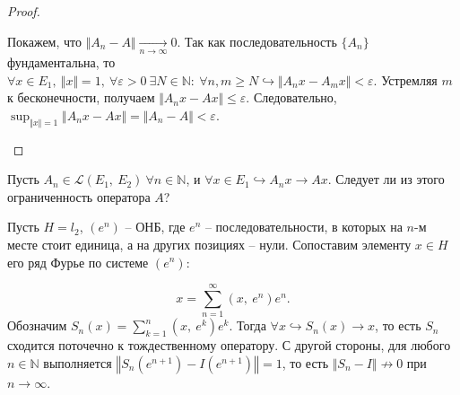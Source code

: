 \begin{proof}
\begin{enumerate}
    Покажем, что $\displaystyle \Vert A_{n} -A\Vert \xrightarrow[n\rightarrow \infty ]{} 0$. Так как последовательность $\displaystyle \{A_{n}\}$ фундаментальна, то $\displaystyle \forall x\in E_{1} ,\ \Vert x\Vert =1,\ \forall \varepsilon  >0\ \exists N\in \mathbb{N} :\ \forall n,m\geqslant N\hookrightarrow \Vert A_{n} x-A_{m} x\Vert < \varepsilon $. Устремляя $\displaystyle m$ к бесконечности, получаем $\displaystyle \Vert A_{n} x-A x\Vert \leqslant \varepsilon $. Следовательно, $\displaystyle \sup _{\Vert x\Vert =1}\Vert A_{n} x-A x\Vert =\Vert A_{n} -A\Vert < \varepsilon $.
\end{enumerate}
\end{proof}
\begin{exercise}
Пусть $\displaystyle A_{n} \in \mathcal{L}( E_{1} ,\ E_{2}) \ \forall n\in \mathbb{N}$, и $\displaystyle \forall x\in E_{1} \hookrightarrow A_{n} x\rightarrow Ax$. Следует ли из этого ограниченность оператора $\displaystyle A$?
\end{exercise}
\begin{example}
Пусть $\displaystyle H=l_{2}$, $\displaystyle \left( e^{n}\right)$ -- ОНБ, где $\displaystyle e^{n}$ -- последовательности, в которых на $\displaystyle n$-м месте стоит единица, а на других позициях -- нули. Сопоставим элементу $\displaystyle x\in H$ его ряд Фурье по системе $\displaystyle \left( e^{n}\right)$:


\begin{equation*}
x=\sum _{n=1}^{\infty }\left( x,\ e^{n}\right) e^{n} .
\end{equation*}
Обозначим $\displaystyle S_{n}( x) =\sum _{k=1}^{n}\left( x,\ e^{k}\right) e^{k}$. Тогда $\displaystyle \forall x\hookrightarrow S_{n}( x)\rightarrow x$, то есть $\displaystyle S_{n}$ сходится поточечно к тождественному оператору. С другой стороны, для любого $\displaystyle n\in \mathbb{N}$ выполняется $\displaystyle \left\Vert S_{n}\left( e^{n+1}\right) -I\left( e^{n+1}\right)\right\Vert =1$, то есть $\displaystyle \Vert S_{n} -I\Vert \nrightarrow 0$ при $\displaystyle n\rightarrow \infty $.

\end{example}